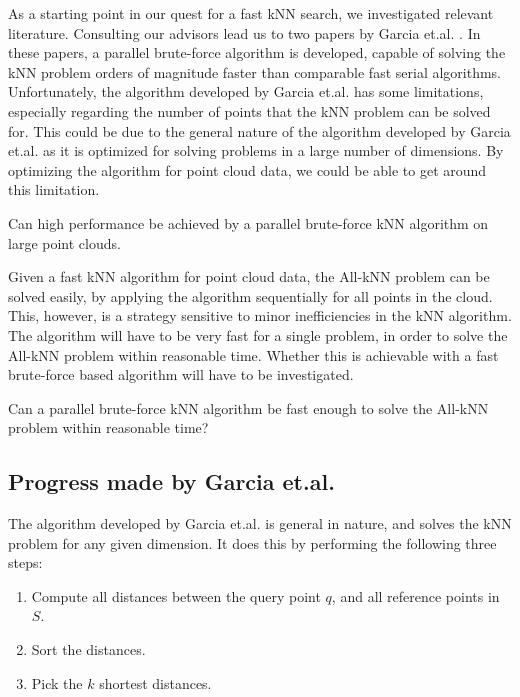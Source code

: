 As a starting point in our quest for a fast kNN search, we investigated relevant literature. Consulting our advisors lead us to two papers by Garcia et.al. \citep{Garcia2008, Garcia2010}. In these papers, a parallel brute-force algorithm is developed, capable of solving the kNN problem orders of magnitude faster than comparable fast serial algorithms. Unfortunately, the algorithm developed by Garcia et.al. has some limitations, especially regarding the number of points that the kNN problem can be solved for. This could be due to the general nature of the algorithm developed by Garcia et.al. as it is optimized for solving problems in a large number of dimensions. By optimizing the algorithm for point cloud data, we could be able to get around this limitation.

\begin{myrq}
    Can high performance be achieved by a parallel brute-force kNN algorithm on large point clouds.
    \label{rq:brute_force_performance}
\end{myrq}

Given a fast kNN algorithm for point cloud data, the All-kNN problem can be solved easily, by applying the algorithm sequentially for all points in the cloud. This, however, is a strategy sensitive to minor inefficiencies in the kNN algorithm. The algorithm will have to be very fast for a single problem, in order to solve the All-kNN problem within reasonable time. Whether this is achievable with a fast brute-force based algorithm will have to be investigated.

\begin{myrq}
    Can a parallel brute-force kNN algorithm be fast enough to solve the All-kNN problem within reasonable time?
    \label{rq:brute_force_Q-kNN}
\end{myrq}

\subsection{Progress made by Garcia et.al.} %
\label{sub:garcia_s_effort}

The algorithm developed by Garcia et.al. is general in nature, and solves the kNN problem for any given dimension. It does this by performing the following three steps:

\begin{enumerate}
       \item Compute all distances between the query point $q$, and all reference points in $S$.
       \item Sort the distances.
       \item Pick the $k$ shortest distances.
\end{enumerate}

